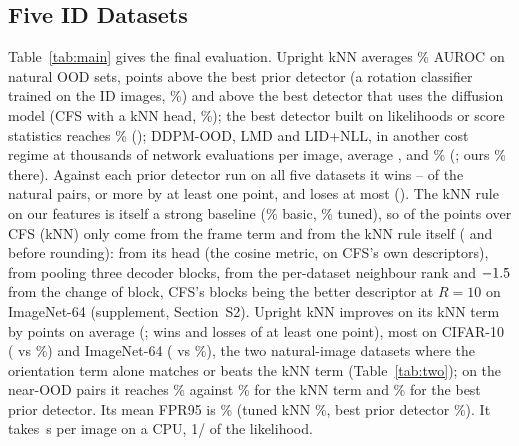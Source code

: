\documentclass{article}
\begin{document}
\subsection{Five ID Datasets}
\label{sec:six}
Table~\ref{tab:main} gives the final evaluation. Upright kNN averages \oursMean\% AUROC on natural OOD sets, \priorGap{} points above the best prior detector (a rotation classifier trained on the ID images, \bestPriorMean\%) and \priorModelGap{} above the best detector that uses the diffusion model (CFS with a kNN head, \bestPriorModelMean\%); the best detector built on likelihoods or score statistics reaches \bestStatMean\% (\bestStatName); DDPM-OOD, LMD and LID+NLL, in another cost regime at thousands of network evaluations per image, average \grMean, \lmdMean{} and \newKamMean\% (\newKamScope{}; ours \newKamOursMean\% there)\pendingKam. Against each prior detector run on all five datasets it wins \priorWinMinNat--\priorWinMaxNat{} of the \nNatPairsMain{} natural pairs, \bigWinPriorMin{} or more by at least one point, and loses at most \priorLossMaxNat{} (\lostNatList\lostNatCostlyNote). The kNN rule on our features is itself a strong baseline (\ctMean\% basic, \tunedMean\% tuned), so of the \priorModelGap{} points over CFS (kNN) only \frameGapTuned{} come from the frame term and \featGap{} from the kNN rule itself (\frameGapTunedTwo{} and \featGapTwo{} before rounding): \featHeadGain{} from its head (the cosine metric, on CFS's own descriptors), \featThreeGain{} from pooling three decoder blocks, \featRankGain{} from the per-dataset neighbour rank and $-1.5$ from the change of block, CFS's blocks being the better descriptor at $R=10$ on ImageNet-64 (supplement, Section~S2). Upright kNN improves on its kNN term by \gainKnnTNat{} points on average (\wtlKnnTNat; \bigWinKnnT{} wins and \bigLossKnnT{} losses of at least one point), most on CIFAR-10 (\oursCten{} vs \knnTCten\%) and ImageNet-64 (\oursIN{} vs \knnTIN\%), the two natural-image datasets where the orientation term alone matches or beats the kNN term (Table~\ref{tab:two}); on the near-OOD pairs it reaches \nearOurs\% against \nearKnnT\% for the kNN term and \nearBestPrior\% for the best prior detector. Its mean FPR95 is \FPRours\% (tuned kNN \FPRbest\%, best prior detector \FPRbestPrior\%). It takes \cpuOurs\,s per image on a CPU, 1/\cpuRatioNll{} of the likelihood.
\end{document}
